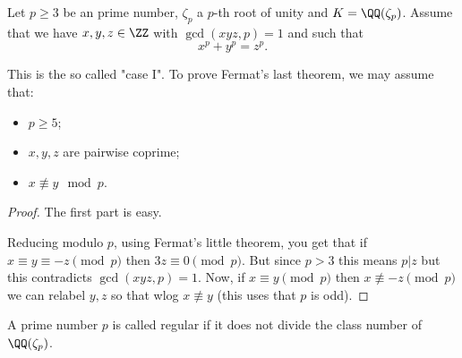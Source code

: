\begin{lemma}\label{lemma:may_assume_coprime}
	\leanok

	Let $p \geq 3$ be an prime number, $\zeta_p$ a $p$-th root of unity and $K=\QQ(\zeta_p)$.  Assume that we have $x,y,z \in \ZZ$ with $\gcd(xyz,p)=1$ and such that \[x^p+y^p=z^p.\]

	This is the so called "case I". To prove Fermat's last theorem, we may assume that:
	\begin{itemize}
		\item $p \geq 5$;
		\item $x,y,z$ are pairwise coprime;
		\item $x \not \equiv y \mod p$.
	\end{itemize}
\end{lemma}
\begin{proof}
	\leanok
	The first part is easy.

	Reducing modulo $p$, using Fermat's little theorem, you get that if $x \equiv y \equiv -z \pmod p$ then $3z \equiv 0 \pmod p$. But since $p >3$ this means $p |z$ but this contradicts $\gcd(xyz,p)=1$. Now, if $x \equiv y \pmod p$ then  $x \not \equiv -z \pmod p$ we can relabel $y,z$ so that wlog $x \not \equiv y$ (this uses that $p$ is odd).
\end{proof}

\begin{definition}\label{defn:is_regular_number}
	\leanok
	A prime number $p$ is called regular if it does not divide the class number of $\QQ(\zeta_p)$.
\end{definition}

